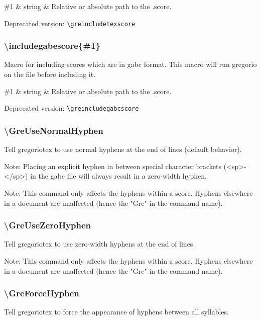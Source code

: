 \begin{argtable}
  \#1 & string & Relative or absolute path to the .\@gtex score.\\
\end{argtable}

\smallskip\hskip 15pt Deprecated version: \verb=\greincludetexscore=

\subsubsection*{\textbackslash includegabescore\{\#1\}}
Macro for including scores which are in gabc format.  This macro will
run gregorio on the file before including it.

\begin{argtable}
  \#1 & string & Relative or absolute path to the .\@gabc score.\\
\end{argtable}

\smallskip\hskip 15pt Deprecated version: \verb=\greincludegabcscore=

\subsubsection*{\textbackslash GreUseNormalHyphen}
Tell gregoriotex to use normal hyphens at the end of lines (default
behavior).

Note: Placing an explicit hyphen in between special character brackets
(\ie <sp>-</sp>) in the gabc file will always result in a zero-width
hyphen.

Note: This command only affects the hyphens within a score.  Hyphens
elsewhere in a document are unaffected (hence the "Gre" in the command
name).

\subsubsection*{\textbackslash GreUseZeroHyphen}	
Tell gregoriotex to use zero-width hyphens at the end of lines.

Note: This command only affects the hyphens within a score.  Hyphens
elsewhere in a document are unaffected (hence the "Gre" in the command
name).

\subsubsection*{\textbackslash GreForceHyphen}
Tell gregoriotex to force the appearance of hyphens between all
syllables.

